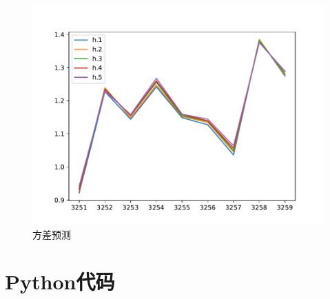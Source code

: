 \documentclass[cn]{homework}
\begin{document}
    \begin{figure}[h]
        \includegraphics[width=\linewidth]{forecast}
        \caption{方差预测}
        \label{fig:forecast}
    \end{figure}

    \newpage
    \appendix
    \section{Python代码}
    
\end{document}
